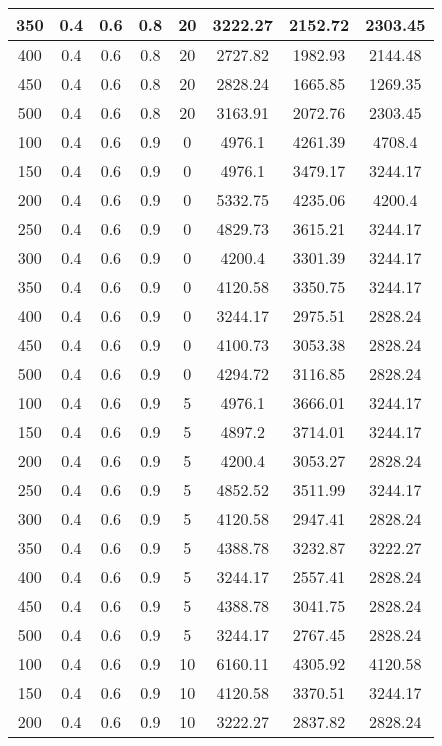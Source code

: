 \documentclass[a4paper, 12pt]{extreport}
\begin{document}
\begin{itemize}
\begin{longtable}{|c|c|c|c|c|c|c|c|}
			350 & 0.4 & 0.6 & 0.8 & 20 & 3222.27 & 2152.72 & 2303.45 \\\hline
			400 & 0.4 & 0.6 & 0.8 & 20 & 2727.82 & 1982.93 & 2144.48 \\\hline
			450 & 0.4 & 0.6 & 0.8 & 20 & 2828.24 & 1665.85 & 1269.35 \\\hline
			500 & 0.4 & 0.6 & 0.8 & 20 & 3163.91 & 2072.76 & 2303.45 \\\hline
			100 & 0.4 & 0.6 & 0.9 & 0 & 4976.1 & 4261.39 & 4708.4 \\\hline
			150 & 0.4 & 0.6 & 0.9 & 0 & 4976.1 & 3479.17 & 3244.17 \\\hline
			200 & 0.4 & 0.6 & 0.9 & 0 & 5332.75 & 4235.06 & 4200.4 \\\hline
			250 & 0.4 & 0.6 & 0.9 & 0 & 4829.73 & 3615.21 & 3244.17 \\\hline
			300 & 0.4 & 0.6 & 0.9 & 0 & 4200.4 & 3301.39 & 3244.17 \\\hline
			350 & 0.4 & 0.6 & 0.9 & 0 & 4120.58 & 3350.75 & 3244.17 \\\hline
			400 & 0.4 & 0.6 & 0.9 & 0 & 3244.17 & 2975.51 & 2828.24 \\\hline
			450 & 0.4 & 0.6 & 0.9 & 0 & 4100.73 & 3053.38 & 2828.24 \\\hline
			500 & 0.4 & 0.6 & 0.9 & 0 & 4294.72 & 3116.85 & 2828.24 \\\hline
			100 & 0.4 & 0.6 & 0.9 & 5 & 4976.1 & 3666.01 & 3244.17 \\\hline
			150 & 0.4 & 0.6 & 0.9 & 5 & 4897.2 & 3714.01 & 3244.17 \\\hline
			200 & 0.4 & 0.6 & 0.9 & 5 & 4200.4 & 3053.27 & 2828.24 \\\hline
			250 & 0.4 & 0.6 & 0.9 & 5 & 4852.52 & 3511.99 & 3244.17 \\\hline
			300 & 0.4 & 0.6 & 0.9 & 5 & 4120.58 & 2947.41 & 2828.24 \\\hline
			350 & 0.4 & 0.6 & 0.9 & 5 & 4388.78 & 3232.87 & 3222.27 \\\hline
			400 & 0.4 & 0.6 & 0.9 & 5 & 3244.17 & 2557.41 & 2828.24 \\\hline
			450 & 0.4 & 0.6 & 0.9 & 5 & 4388.78 & 3041.75 & 2828.24 \\\hline
			500 & 0.4 & 0.6 & 0.9 & 5 & 3244.17 & 2767.45 & 2828.24 \\\hline
			100 & 0.4 & 0.6 & 0.9 & 10 & 6160.11 & 4305.92 & 4120.58 \\\hline
			150 & 0.4 & 0.6 & 0.9 & 10 & 4120.58 & 3370.51 & 3244.17 \\\hline
			200 & 0.4 & 0.6 & 0.9 & 10 & 3222.27 & 2837.82 & 2828.24 \\\hline

\end{longtable}
\end{itemize}
\end{document}
